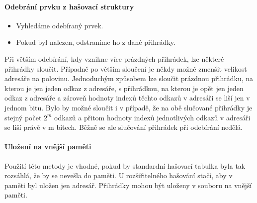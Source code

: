 \documentclass[10pt,a4paper]{article}
\begin{document}
\paragraph{Odebrání prvku z hašovací struktury}
\begin{itemize}
	\item Vyhledáme odebíraný prvek.
	\item Pokud byl nalezen, odstraníme ho z dané přihrádky.
\end{itemize}
Při větším odebírání, kdy vznikne více prázdných přihrádek, lze některé přihrádky sloučit. Případně po větším sloučení je někdy možné zmenšit velikost adresáře na polovinu. Jednoduchým způsobem lze sloučit prázdnou přihrádku, na kterou je jen jeden odkaz z adresáře, s přihrádkou, na kterou je opět jen jeden odkaz z adresáře a zároveň hodnoty indexů těchto odkazů v adresáři se liší jen v jednom bitu. Bylo by možné sloučit i v případě, že na obě slučované přihrádky je stejný počet $2^m$ odkazů a přitom hodnoty indexů jednotlivých odkazů v adresáři se liší právě v m bitech. Běžně se ale slučování přihrádek při odebírání nedělá.
\paragraph{Uložení na vnější paměti}
Použití této metody je vhodné, pokud by standardní hašovací tabulka byla tak rozsáhlá, že by se nevešla do paměti. U rozšiřitelného hašování stačí, aby v paměti byl uložen jen adresář. Přihrádky mohou být uloženy v souboru na vnější paměti.
\end{document}
